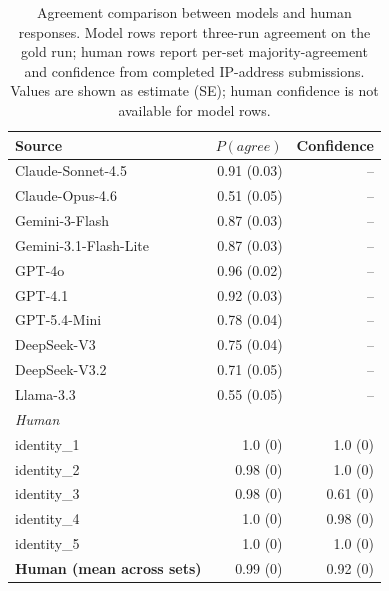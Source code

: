 \begin{table}[t]
\centering
\small
\renewcommand{\arraystretch}{1.08}
\begin{tabular}{lrr}
\toprule
Source & $P(agree)$ & Confidence \\
\midrule
Claude-Sonnet-4.5 & 0.91 (0.03) & -- \\
Claude-Opus-4.6 & 0.51 (0.05) & -- \\
Gemini-3-Flash & 0.87 (0.03) & -- \\
Gemini-3.1-Flash-Lite & 0.87 (0.03) & -- \\
GPT-4o & 0.96 (0.02) & -- \\
GPT-4.1 & 0.92 (0.03) & -- \\
GPT-5.4-Mini & 0.78 (0.04) & -- \\
DeepSeek-V3 & 0.75 (0.04) & -- \\
DeepSeek-V3.2 & 0.71 (0.05) & -- \\
Llama-3.3 & 0.55 (0.05) & -- \\
\textit{Human} &  &  \\
identity_1 & 1.0 (0) & 1.0 (0) \\
identity_2 & 0.98 (0) & 1.0 (0) \\
identity_3 & 0.98 (0) & 0.61 (0) \\
identity_4 & 1.0 (0) & 0.98 (0) \\
identity_5 & 1.0 (0) & 1.0 (0) \\
\textbf{Human (mean across sets)} & 0.99 (0) & 0.92 (0) \\
\bottomrule
\end{tabular}
\caption{Agreement comparison between models and human responses. Model rows report three-run agreement on the gold run; human rows report per-set majority-agreement and confidence from completed IP-address submissions. Values are shown as estimate (SE); human confidence is not available for model rows.}
\label{tab:identity_agreement_human_comparison}
\end{table}
